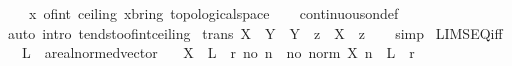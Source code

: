 \begin{isabellebody}
\ \ \ \ {\isacharparenleft}{\kern0pt}{\isasymlambda}x{\isachardot}{\kern0pt}\ of{\isacharunderscore}{\kern0pt}int\ {\isacharparenleft}{\kern0pt}ceiling\ x{\isacharparenright}{\kern0pt}{\isacharcolon}{\kern0pt}{\isacharcolon}{\kern0pt}{\isacharprime}{\kern0pt}b{\isacharcolon}{\kern0pt}{\isacharcolon}{\kern0pt}{\isacharbraceleft}{\kern0pt}ring{\isacharunderscore}{\kern0pt}{}{\isacharcomma}{\kern0pt}\ topological{\isacharunderscore}{\kern0pt}space{\isacharbraceright}{\kern0pt}{\isacharparenright}{\kern0pt}{\isachardoublequoteclose}\isanewline
%
\isadelimproof
\ \ %
\endisadelimproof
%
\isatagproof
{}\isamarkupfalse%
\ continuous{\isacharunderscore}{\kern0pt}on{\isacharunderscore}{\kern0pt}def\isanewline
\ \ \isamarkupfalse%
\ {\isacharparenleft}{\kern0pt}auto\ intro{\isacharbang}{\kern0pt}{\isacharcolon}{\kern0pt}\ tendsto{\isacharunderscore}{\kern0pt}of{\isacharunderscore}{\kern0pt}int{\isacharunderscore}{\kern0pt}ceiling{\isacharparenright}{\kern0pt}%
\endisatagproof
{\isafoldproof}%
%
\isadelimproof
%
\endisadelimproof
%
\isadelimdocument
%
\endisadelimdocument
%
\isatagdocument
%
\isamarkuptrue%
%
\endisatagdocument
{\isafolddocument}%
%
\isadelimdocument
%
\endisadelimdocument
{}\isamarkupfalse%
\ {\isacharbrackleft}{\kern0pt}trans{\isacharbrackright}{\kern0pt}{\isacharcolon}{\kern0pt}\ {\isachardoublequoteopen}X\ {\isacharequal}{\kern0pt}\ Y\ {\isasymLongrightarrow}\ Y\ {\isasymlonglonglongrightarrow}\ z\ {\isasymLongrightarrow}\ X\ {\isasymlonglonglongrightarrow}\ z{\isachardoublequoteclose}\isanewline
%
\isadelimproof
\ \ %
\endisadelimproof
%
\isatagproof
{}\isamarkupfalse%
\ simp%
\endisatagproof
{\isafoldproof}%
%
\isadelimproof
\isanewline
%
\endisadelimproof
\isanewline
{}\isamarkupfalse%
\ LIMSEQ{\isacharunderscore}{\kern0pt}iff{\isacharcolon}{\kern0pt}\isanewline
\ \ \ L\ {\isacharcolon}{\kern0pt}{\isacharcolon}{\kern0pt}\ {\isachardoublequoteopen}{\isacharprime}{\kern0pt}a{\isacharcolon}{\kern0pt}{\isacharcolon}{\kern0pt}real{\isacharunderscore}{\kern0pt}normed{\isacharunderscore}{\kern0pt}vector{\isachardoublequoteclose}\isanewline
\ \ \ {\isachardoublequoteopen}{\isacharparenleft}{\kern0pt}X\ {\isasymlonglonglongrightarrow}\ L{\isacharparenright}{\kern0pt}\ {\isacharequal}{\kern0pt}\ {\isacharparenleft}{\kern0pt}{\isasymforall}r{\isachargreater}{\kern0pt}{}{\isachardot}{\kern0pt}\ {\isasymexists}no{\isachardot}{\kern0pt}\ {\isasymforall}n\ {\isasymge}\ no{\isachardot}{\kern0pt}\ norm\ {\isacharparenleft}{\kern0pt}X\ n\ {\isacharminus}{\kern0pt}\ L{\isacharparenright}{\kern0pt}\ {\isacharless}{\kern0pt}\ r{\isacharparenright}{\kern0pt}{\isachardoublequoteclose}\isanewline

\end{isabellebody}
